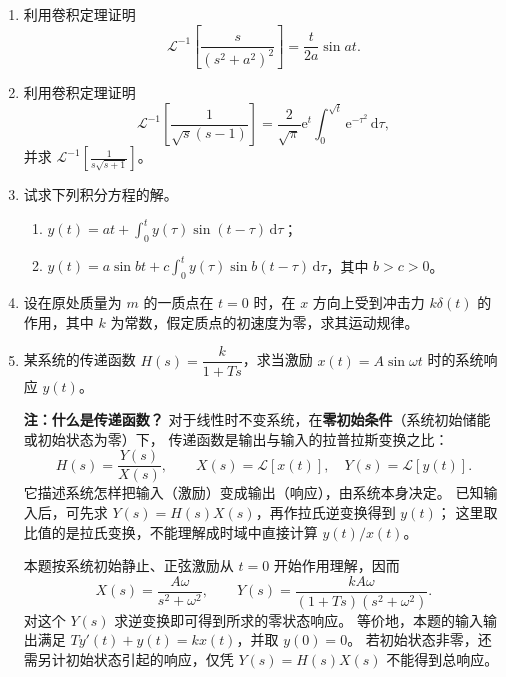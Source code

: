 \documentclass[UTF8,11pt,a4paper]{ctexart}
\newcommand{\dd}{\,\mathrm{d}}
\newcommand{\ee}{\mathrm{e}}
\begin{document}
\begin{enumerate}
\item 利用卷积定理证明
\[
\mathcal L^{-1}\!\left[\frac{s}{(s^2+a^2)^2}\right]=\frac t{2a}\sin at.
\]

\item 利用卷积定理证明
\[
\mathcal L^{-1}\!\left[\frac1{\sqrt s(s-1)}\right]
=\frac2{\sqrt\pi}\ee^t\int_0^{\sqrt t}\ee^{-\tau^2}\dd\tau,
\]
并求 $\displaystyle\mathcal L^{-1}\!\left[\frac1{s\sqrt{s+1}}\right]$。

\item 试求下列积分方程的解。
  \begin{enumerate}
  \item $\displaystyle y(t)=at+\int_0^t y(\tau)\sin(t-\tau)\dd\tau$；
  \item $\displaystyle y(t)=a\sin bt+c\int_0^t y(\tau)\sin b(t-\tau)\dd\tau$，其中 $b>c>0$。
  \end{enumerate}

\item 设在原处质量为 $m$ 的一质点在 $t=0$ 时，在 $x$ 方向上受到冲击力 $k\delta(t)$ 的作用，其中 $k$ 为常数，假定质点的初速度为零，求其运动规律。

\item 某系统的传递函数 $H(s)=\dfrac{k}{1+Ts}$，求当激励 $x(t)=A\sin\omega t$ 时的系统响应 $y(t)$。

\par\smallskip
\noindent\textbf{注：什么是传递函数？}
对于线性时不变系统，在\textbf{零初始条件}（系统初始储能或初始状态为零）下，
传递函数是输出与输入的拉普拉斯变换之比：
\[
H(s)=\frac{Y(s)}{X(s)},\qquad
X(s)=\mathcal L[x(t)],\quad Y(s)=\mathcal L[y(t)].
\]
它描述系统怎样把输入（激励）变成输出（响应），由系统本身决定。
已知输入后，可先求 $Y(s)=H(s)X(s)$，再作拉氏逆变换得到 $y(t)$；
这里取比值的是拉氏变换，不能理解成时域中直接计算 $y(t)/x(t)$。

本题按系统初始静止、正弦激励从 $t=0$ 开始作用理解，因而
\[
X(s)=\frac{A\omega}{s^2+\omega^2},\qquad
Y(s)=\frac{kA\omega}{(1+Ts)(s^2+\omega^2)}.
\]
对这个 $Y(s)$ 求逆变换即可得到所求的零状态响应。
等价地，本题的输入输出满足 $T y'(t)+y(t)=k x(t)$，并取 $y(0)=0$。
若初始状态非零，还需另计初始状态引起的响应，仅凭 $Y(s)=H(s)X(s)$ 不能得到总响应。
\end{enumerate}

\newpage
\end{document}
